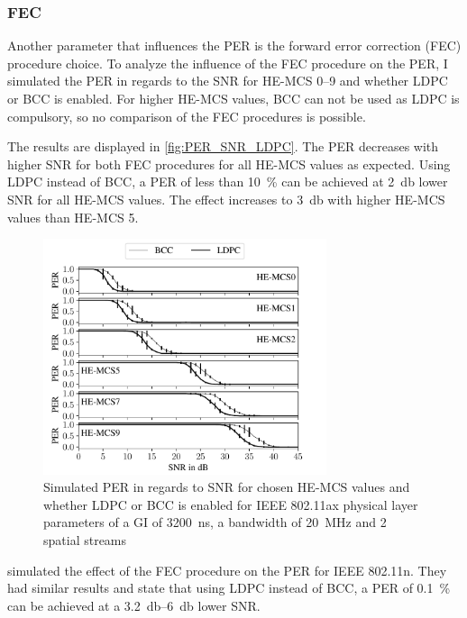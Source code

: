 \subsubsection*{\acf{FEC}}
Another parameter that influences the \ac{PER} is the forward error correction (FEC) procedure choice. To
analyze the influence of the FEC procedure on the \ac{PER}, I simulated the \ac{PER} in regards to the \ac{SNR} for \ac{HE}-\ac{MCS}
\numrange{0}{9} and whether \ac{LDPC} or \ac{BCC} is enabled. For higher \ac{HE}-\ac{MCS} values, \ac{BCC} can not be used as \ac{LDPC} is compulsory, so no comparison of the \ac{FEC} procedures is possible.

The results are displayed in \autoref{fig:PER_SNR_LDPC}. The \ac{PER} decreases with higher \ac{SNR} for both \ac{FEC} procedures for all \ac{HE}-\ac{MCS} values as
expected. Using \ac{LDPC} instead of \ac{BCC}, a \ac{PER} of less than \SI{10}{\percent} can be achieved at \SI{2}{\decibel} lower \ac{SNR}
for all \ac{HE}-\ac{MCS} values. The effect increases to \SI{3}{\decibel} with higher \ac{HE}-\ac{MCS} values than \ac{HE}-\ac{MCS} \num{5}.
\begin{figure}[H]%
   \centering
   \includegraphics[width=0.74\textwidth]{figures/LDPC_PER_to_SNR.pdf}
   \caption{Simulated \ac{PER} in regards to \ac{SNR} for chosen \ac{HE}-\ac{MCS} values and whether \ac{LDPC} or \ac{BCC} is enabled for IEEE 802.11ax physical layer parameters of a \ac{GI} of \SI{3200}{\nano\second}, a bandwidth of \SI{20}{\mega\hertz} and 2 spatial streams}%
   \label{fig:PER_SNR_LDPC}%
\end{figure}

\textcite{syafei_performance_2009} simulated the effect of the \ac{FEC} procedure on the \ac{PER} for IEEE 802.11n. They
had similar results and state that using \ac{LDPC} instead of \ac{BCC}, a \ac{PER} of \SI{0.1}{\percent}  can be achieved at a
\SIrange{3.2}{6}{\decibel} lower \ac{SNR}.

